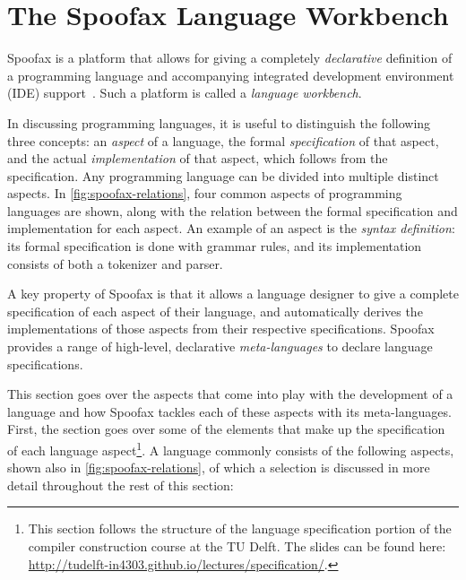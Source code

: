 \section{The Spoofax Language Workbench}
\label{sec:spoofax}
Spoofax is a platform that allows for giving a completely \emph{declarative}
definition of a programming language and accompanying integrated development
environment (IDE) support~\cite{Kats10a}. Such a platform is called a
\emph{language workbench}.

In discussing programming languages, it is useful to distinguish the following
three concepts: an \textit{aspect} of a language, the formal
\textit{specification} of that aspect, and the actual \textit{implementation} of
that aspect, which follows from the specification. Any programming language can
be divided into multiple distinct aspects. In \cref{fig:spoofax-relations}, four
common aspects of programming languages are shown, along with the relation
between the formal specification and implementation for each aspect. An example
of an aspect is the \textit{syntax definition}: its formal specification is done
with grammar rules, and its implementation consists of both a tokenizer and
parser.

A key property of Spoofax is that it allows a language designer to give a
complete specification of each aspect of their language, and automatically
derives the implementations of those aspects from their respective
specifications. Spoofax provides a range of high-level, declarative
\textit{meta-languages} to declare language specifications.

This section goes over the aspects that come into play with the development of a
language and how Spoofax tackles each of these aspects with its
meta-languages. First, the section goes over some of the elements that make up
the specification of each language aspect\footnote{This section follows the
  structure of the language specification portion of the compiler construction
  course at the TU Delft. The slides can be found here:
  \url{http://tudelft-in4303.github.io/lectures/specification/}.}. A language
commonly consists of the following aspects, shown also in
\cref{fig:spoofax-relations}, of which a selection is discussed in more
detail throughout the rest of this section:

